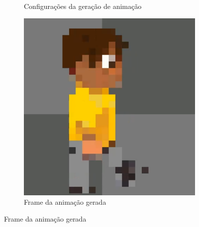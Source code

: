 \begin{figure}[htbp]
\begin{subfigure}{0.6\linewidth}
        \caption{\small Configurações da geração de animação}
        \label{fig:pixelLabAnimacao1a}
    \end{subfigure}
    \begin{subfigure}{0.35\linewidth}
        \includegraphics[width=1\linewidth]{figs/pixelLab/dia3/print2.PNG}
        \caption{\small Frame da animação gerada}
        \label{fig:pixelLabAnimacao1b}
    \end{subfigure}
\end{figure}


